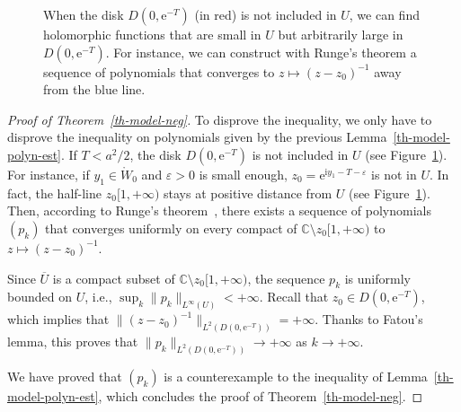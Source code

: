 \documentclass[AHL,Unicode,longabstracts,published]{cedram}
\newcommand{\1}{\mathds 1}
\newcommand{\C}{\mathbb{C}}
\newcommand{\rgW}{\mathring{W}}
\newcommand{\eu}{\mathrm e}
\newcommand{\iu}{\mathrm i}
\newcommand{\e}{\varepsilon}
\begin{document}
\begin{figure}
\centering
{}
\caption{When the disk $D(0,\eu^{-T})$ (in red) is not included in $U$, we can find holomorphic functions that are small in $U$ but arbitrarily large in $D(0,\eu^{-T})$. For instance, we can construct with Runge's theorem a sequence of polynomials that converges to $z\mapsto(z-z_0)^{-1}$ away from the blue line.}\label{fig:runge-R}
\end{figure}

\begin{proof}[Proof of Theorem~\ref{th-model-neg}]
To disprove the inequality, we only have to disprove the inequality on polynomials given by the previous Lemma~\ref{th-model-polyn-est}. If $T< a^2/2$, the disk $D(0,\eu^{-T})$ is not included in $U$ (see Figure~\ref{fig:runge-R}). For instance, if $y_1\in \rgW_0$ and $\e>0$ is small enough, $z_0 = \eu^{\iu y_1 -T-\e}$ is not in $U$. In fact, the half-line $z_0[1,+\infty)$ stays at positive distance from $U$ (see Figure~\ref{fig:runge-R}). Then, according to Runge's theorem~\cite[Theorem~13.9]{Rudin86}, there exists a sequence of polynomials $(p_k)$ that converges uniformly on every compact of $\C \setminus z_0[1,+\infty)$ to $z\mapsto (z-z_0)^{-1}$.

Since $\overline U$ is a compact subset of $\C \setminus z_0[1,+\infty)$, the sequence $p_k$ is uniformly bounded on $U$, i.e., $\sup_k \|p_k\|_{L^\infty(U)} < +\infty$. Recall that $z_0 \in D(0,\eu^{-T})$, which implies that ${\|(z-z_0)^{-1}\|_{L^2(D(0,\eu^{-T}))}} = +\infty$. Thanks to Fatou's lemma, this proves that $\|p_k\|_{L^2(D(0,\eu^{-T}))} \to +\infty$ as $k\to + \infty$.

We have proved that $(p_k)$ is a counterexample to the inequality of Lemma~\ref{th-model-polyn-est}, which concludes the proof of Theorem~\ref{th-model-neg}.
\end{proof}
\end{document}
